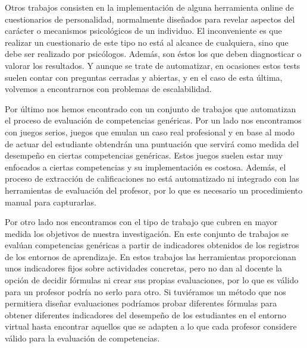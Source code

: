 Otros trabajos consisten en la implementación de alguna herramienta online de cuestionarios de personalidad, normalmente diseñados para revelar aspectos del carácter o mecanismos psicológicos de un individuo. El inconveniente es que realizar un cuestionario de este tipo no está al alcance de cualquiera, sino que debe ser realizado por psicólogos. Además, son éstos los que deben diagnosticar o valorar los resultados. Y aunque se trate de automatizar, en ocasiones estos tests suelen contar con preguntas cerradas y abiertas, y en el caso de esta última, volvemos a encontrarnos con problemas de escalabilidad.

Por último nos hemos encontrado con un conjunto de trabajos que automatizan el proceso de evaluación de competencias genéricas. Por un lado nos encontramos con juegos serios, juegos que emulan un caso real profesional y en base al modo de actuar del estudiante obtendrán una puntuación que servirá como medida del desempeño en ciertas competencias genéricas. Estos juegos suelen estar muy enfocados a ciertas competencias y su implementación es costosa. Además, el proceso de extracción de calificaciones no está automatizado ni integrado con las herramientas de evaluación del profesor, por lo que es necesario un procedimiento manual para capturarlas.

Por otro lado nos encontramos con el tipo de trabajo que cubren en mayor medida los objetivos de nuestra investigación. En este conjunto de trabajos se evalúan competencias genéricas a partir de indicadores obtenidos de los registros de los entornos de aprendizaje. En estos trabajos las herramientas proporcionan unos indicadores fijos sobre actividades concretas, pero no dan al docente la opción de decidir fórmulas ni crear sus propias evaluaciones, por lo que es válido para un profesor podría no serlo para otro. Si tuviéramos un método que nos permitiera diseñar evaluaciones podríamos probar diferentes fórmulas para obtener diferentes indicadores del desempeño de los estudiantes en el entorno virtual hasta encontrar aquellos que se adapten a lo que cada profesor considere válido para la evaluación de competencias.

\pagestyle{fancy}



